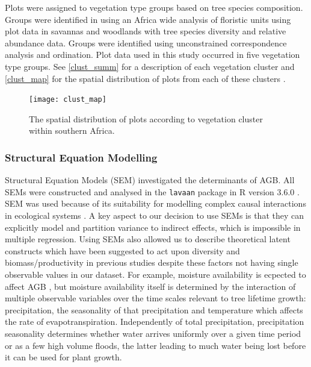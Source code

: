 \documentclass[11pt,a4paper]{article}
\begin{document}
Plots were assigned to vegetation type groups based on tree species composition. Groups were identified in \citet{Fayolle2018} using an Africa wide analysis of floristic units using plot data in savannas and woodlands with tree species diversity and relative abundance data. Groups were identified using unconstrained correspondence analysis and ordination. Plot data used in this study occurred in five vegetation type groups. See \autoref{clust_summ} for a description of each vegetation cluster and \autoref{clust_map} for the spatial distribution of plots from each of these clusters .

\begin{landscape}



\begin{figure}[H]
\centering
	\texttt{[image: clust\_map]}
	\caption{The spatial distribution of plots according to vegetation cluster within southern Africa.}
	\label{clust_map}
\end{figure}
\end{landscape}

\subsubsection{Structural Equation Modelling}

Structural Equation Models (SEM) investigated the determinants of AGB. All SEMs were constructed and analysed in the \verb|lavaan| package \citep{lavaan} in R version 3.6.0 \citep{R2019}. SEM was used because of its suitability for modelling complex causal interactions in ecological systems \citep{Lee2007}. A key aspect to our decision to use SEMs is that they can explicitly model and partition variance to indirect effects, which is impossible in multiple regression. Using SEMs also allowed us to describe theoretical latent constructs which have been suggested to act upon diversity and biomass/productivity in previous studies despite these factors not having single observable values in our dataset. For example, moisture availability is ecpected to affect AGB \citep{Saito2014, Campbell1996}, but moisture availability itself is determined by the interaction of multiple observable variables over the time scales relevant to tree lifetime growth: precipitation, the seasonality of that precipitation and temperature which affects the rate of evapotranspiration. Independently of total precipitation, precipitation seasonality determines whether water arrives uniformly over a given time period or as a few high volume floods, the latter leading to much water being lost before it can be used for plant growth. 
\end{document}
